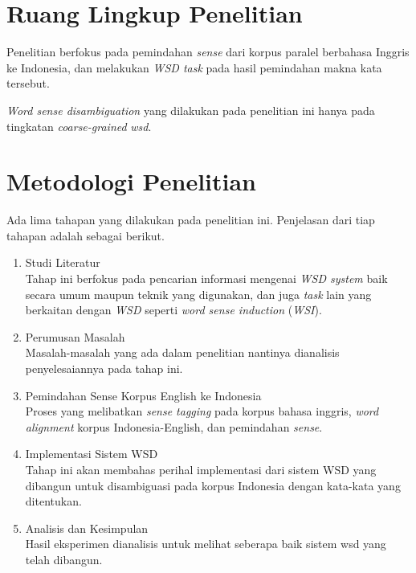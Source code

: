 \section{Ruang Lingkup Penelitian}
Penelitian berfokus pada pemindahan \textit{sense} dari korpus paralel berbahasa Inggris ke Indonesia, dan melakukan \textit{WSD task} pada hasil pemindahan makna kata tersebut.

\textit{Word sense disambiguation} yang dilakukan pada penelitian ini hanya pada tingkatan \textit{coarse-grained} \textit{wsd}.

\section{Metodologi Penelitian}
Ada lima tahapan yang dilakukan pada penelitian ini. Penjelasan dari tiap tahapan adalah sebagai berikut.
\begin{enumerate}
	\item Studi Literatur \\
	Tahap ini berfokus pada pencarian informasi mengenai \textit{WSD system} baik secara umum maupun teknik yang digunakan, dan juga \textit{task} lain yang berkaitan dengan \textit{WSD} seperti \textit{word sense induction} (\textit{WSI}).
	\item Perumusan Masalah \\
	Masalah-masalah yang ada dalam penelitian nantinya dianalisis penyelesaiannya pada tahap ini.
	\item Pemindahan Sense Korpus English ke Indonesia\\
	Proses yang melibatkan \textit{sense tagging} pada korpus bahasa inggris, \textit{word alignment} korpus Indonesia-English, dan pemindahan \textit{sense}.
	\item Implementasi Sistem WSD  \\
	Tahap ini akan membahas perihal implementasi dari sistem WSD yang dibangun untuk disambiguasi pada korpus Indonesia dengan kata-kata yang ditentukan.
	\item Analisis dan Kesimpulan \\
	Hasil eksperimen dianalisis untuk melihat seberapa baik sistem wsd yang telah dibangun.
\end{enumerate}


